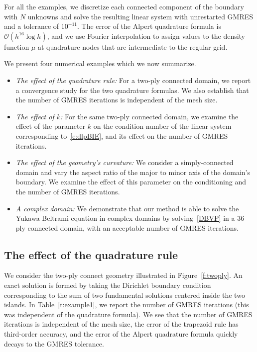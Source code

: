 For all the examples, we discretize each connected component of the
boundary with $N$ unknowns and solve the resulting linear system with
unrestarted GMRES and a tolerance of $10^{-11}$.  The error of the
Alpert quadrature formula is $\mathcal{O}(h^{16}\log h)$, and we use
Fourier interpolation to assign values to the density function $\mu$ at
quadrature nodes that are intermediate to the regular grid.

We present four numerical examples which we now summarize.
\begin{itemize}
  \item{\em{The effect of the quadrature rule}:} For a two-ply connected
  domain, we report a convergence study for the two quadrature formulas.
  We also establish that the number of GMRES iterations is independent
  of the mesh size.

  \item{\em{The effect of $k$}:} For the same two-ply connected
  domain, we examine the effect of the parameter $k$ on the condition
  number of the linear system corresponding to~\eqref{e:dlpBIE}, and
  its effect on the number of GMRES iterations.

  \item{\em{The effect of the geometry's curvature}:} We consider a
  simply-connected domain and vary the aspect ratio of the major to
  minor axis of the domain's boundary.  We examine the effect of this
  parameter on the conditioning and the number of GMRES iterations.

  \item{\em{A complex domain}:} We demonstrate that our method is able
  to solve the Yukawa-Beltrami equation in complex domains by
  solving~\eqref{DBVP} in a 36-ply connected domain, with an acceptable
  number of GMRES iterations.
\end{itemize}


\subsection{The effect of the quadrature rule}
We consider the two-ply connect geometry illustrated in
Figure~\ref{f:twoply}.  An exact solution is formed by taking the
Dirichlet boundary condition corresponding to the sum of two fundamental
solutions centered inside the two islands.  In Table~\ref{t:example1},
we report the number of GMRES iterations (this was independent of the
quadrature formula).  We see that the number of GMRES iterations is
independent of the mesh size, the error of the trapezoid rule has
third-order accuracy, and the error of the Alpert quadrature formula
quickly decays to the GMRES tolerance.

